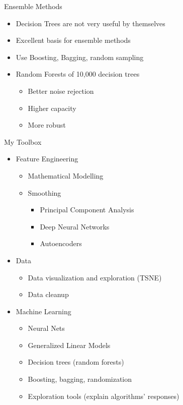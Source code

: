 \documentclass{beamer}
\begin{document}
\begin{frame}{Ensemble Methods}
  \begin{itemize}
  \item Decision Trees are not very useful by themselves
  \item Excellent basis for \alert{ensemble methods}
  \item Use Boosting, Bagging, random sampling
  \item Random Forests of 10,000 decision trees
    \begin{itemize}
    \item Better noise rejection
    \item Higher capacity
    \item More robust
    \end{itemize}
  \end{itemize}
\end{frame}

\begin{frame}{My Toolbox}

  \begin{itemize}
  \item Feature Engineering
    \begin{itemize}
    \item Mathematical Modelling
    \item Smoothing
      \begin{itemize}
        \item Principal Component Analysis
        \item Deep Neural Networks
        \item Autoencoders
      \end{itemize}
    \end{itemize}
  \item Data
    \begin{itemize}
    \item Data visualization and exploration (TSNE)
    \item Data cleanup
    \end{itemize}
  \item Machine Learning
    \begin{itemize}
    \item Neural Nets
    \item Generalized Linear Models
    \item Decision trees (random forests)
    \item Boosting, bagging, randomization
    \item Exploration tools (explain algorithms' responses)
    \end{itemize}
  \end{itemize}
\end{frame}
\end{document}
